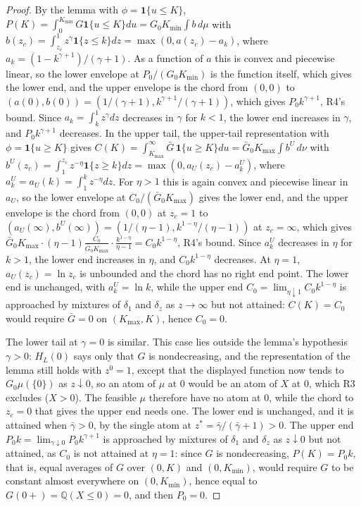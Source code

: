 \documentclass[11pt]{article}
\theoremstyle{remark}
\newcommand{\Q}{\mathbb{Q}}
\begin{document}
\begin{proof}
By the lemma with $\phi=\mathbf 1\{u\le K\}$, $P(K)=\int_0^{K_{\min}}G\mathbf 1\{u\le K\}du=G_0K_{\min}\int b\,d\mu$ with $b(z_c)=\int_{z_c}^1z^\gamma\mathbf 1\{z\le k\}dz=\max(0,a(z_c)-a_k)$, where $a_k=(1-k^{\gamma+1})/(\gamma+1)$. As a function of $a$ this is convex and piecewise linear, so the lower envelope at $P_0/(G_0K_{\min})$ is the function itself, which gives the lower end, and the upper envelope is the chord from $(0,0)$ to $(a(0),b(0))=(1/(\gamma+1),k^{\gamma+1}/(\gamma+1))$, which gives $P_0k^{\gamma+1}$, R4's bound. Since $a_k=\int_k^1z^\gamma dz$ decreases in $\gamma$ for $k<1$, the lower end increases in $\gamma$, and $P_0k^{\gamma+1}$ decreases. In the upper tail, the upper-tail representation with $\phi=\mathbf 1\{u\ge K\}$ gives $C(K)=\int_{K_{\max}}^\infty\bar G\,\mathbf 1\{u\ge K\}du=\bar G_0K_{\max}\int b^U\,d\nu$ with $b^U(z_c)=\int_1^{z_c}z^{-\eta}\mathbf 1\{z\ge k\}dz=\max(0,a_U(z_c)-a^U_k)$, where $a^U_k=a_U(k)=\int_1^kz^{-\eta}dz$. For $\eta>1$ this is again convex and piecewise linear in $a_U$, so the lower envelope at $C_0/(\bar G_0K_{\max})$ gives the lower end, and the upper envelope is the chord from $(0,0)$ at $z_c=1$ to $(a_U(\infty),b^U(\infty))=(1/(\eta-1),k^{1-\eta}/(\eta-1))$ at $z_c=\infty$, which gives $\bar G_0K_{\max}\cdot(\eta-1)\frac{C_0}{\bar G_0K_{\max}}\cdot\frac{k^{1-\eta}}{\eta-1}=C_0k^{1-\eta}$, R4's bound. Since $a^U_k$ decreases in $\eta$ for $k>1$, the lower end increases in $\eta$, and $C_0k^{1-\eta}$ decreases. At $\eta=1$, $a_U(z_c)=\ln z_c$ is unbounded and the chord has no right end point. The lower end is unchanged, with $a^U_k=\ln k$, while the upper end $C_0=\lim_{\eta\downarrow1}C_0k^{1-\eta}$ is approached by mixtures of $\delta_1$ and $\delta_z$ as $z\to\infty$ but not attained: $C(K)=C_0$ would require $\bar G=0$ on $(K_{\max},K)$, hence $C_0=0$.

The lower tail at $\gamma=0$ is similar. This case lies outside the lemma's hypothesis $\gamma>0$: $H_L(0)$ says only that $G$ is nondecreasing, and the representation of the lemma still holds with $z^0=1$, except that the displayed function now tends to $G_0\mu(\{0\})$ as $z\downarrow0$, so an atom of $\mu$ at $0$ would be an atom of $X$ at $0$, which R3 excludes ($X>0$). The feasible $\mu$ therefore have no atom at $0$, while the chord to $z_c=0$ that gives the upper end needs one. The lower end is unchanged, and it is attained when $\bar\gamma>0$, by the single atom at $z^*=\bar\gamma/(\bar\gamma+1)>0$. The upper end $P_0k=\lim_{\gamma\downarrow0}P_0k^{\gamma+1}$ is approached by mixtures of $\delta_1$ and $\delta_z$ as $z\downarrow0$ but not attained, as $C_0$ is not attained at $\eta=1$: since $G$ is nondecreasing, $P(K)=P_0k$, that is, equal averages of $G$ over $(0,K)$ and $(0,K_{\min})$, would require $G$ to be constant almost everywhere on $(0,K_{\min})$, hence equal to $G(0+)=\Q(X\le0)=0$, and then $P_0=0$.
\end{proof}
\end{document}
